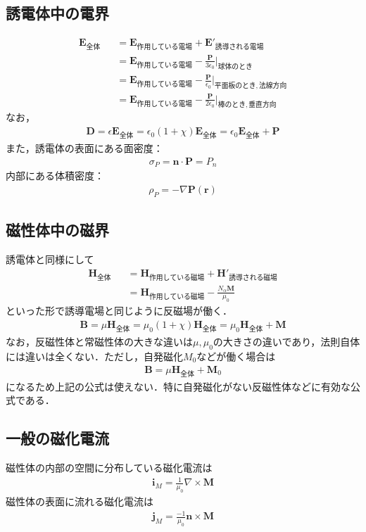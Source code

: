 \documentclass[12pt,dvipdfmx]{jsarticle}
\begin{document}
\subsection*{\large{誘電体中の電界}}
\begin{eqnarray}
  \bm{E}_{全体} &&= \bm{E}_{作用している電場} + \bm{E}'_{誘導される電場}\\
  &&=\bm{E}_{作用している電場} - \frac{\bm{P}}{3\epsilon_0}|_{球体のとき}\\
  &&=\bm{E}_{作用している電場} - \frac{\bm{P}}{\epsilon_0}|_{平面板のとき, 法線方向}\\
  &&=\bm{E}_{作用している電場} - \frac{\bm{P}}{2\epsilon_0}|_{棒のとき, 垂直方向}
\end{eqnarray}
なお，
\begin{eqnarray}
  \bm{D} = \epsilon \bm{E}_{全体}= \epsilon_0\left(1+\chi  \right)\bm{E}_{全体} = \epsilon_0 \bm{E}_{全体} + \bm{P}  
\end{eqnarray}
また，誘電体の表面にある面密度：
\begin{eqnarray}
  \sigma_P = \bm{n}\cdot\bm{P}=P_n
\end{eqnarray}
内部にある体積密度：
\begin{eqnarray}
  \rho_P = -\nabla\bm{P}(\bm{r})
\end{eqnarray}
\subsection*{\large{磁性体中の磁界}}
誘電体と同様にして
\begin{eqnarray}
  \bm{H}_{全体} &&= \bm{H}_{作用している磁場}+\bm{H}'_{誘導される磁場}\\
  &&=\bm{H}_{作用している磁場}-\frac{N_{\alpha}\bm{M}}{\mu_0}
\end{eqnarray}
といった形で誘導電場と同じように反磁場が働く．
\begin{eqnarray}
  \bm{B} = \mu\bm{H}_{全体}= \mu_0(1+\chi)\bm{H}_{全体}= \mu_0 \bm{H}_{全体} + \bm{M}
\end{eqnarray}
なお，反磁性体と常磁性体の大きな違いは$\mu,\mu_0$の大きさの違いであり，法則自体には違いは全くない．ただし，自発磁化$M_0$などが働く場合は
\begin{eqnarray}
  \bm{B} = \mu\bm{H}_{全体} + \bm{M}_0
\end{eqnarray}
になるため上記の公式は使えない．特に自発磁化がない反磁性体などに有効な公式である．
\subsection*{一般の磁化電流}
磁性体の内部の空間に分布している磁化電流は
\begin{eqnarray}
  \bm{i}_M = \frac{1}{\mu_0}\nabla\times\bm{M}
\end{eqnarray}
磁性体の表面に流れる磁化電流は
\begin{eqnarray}
  \bm{j}_M = \frac{-1}{\mu_0}\bm{n}\times\bm{M}
\end{eqnarray}
\end{document}
